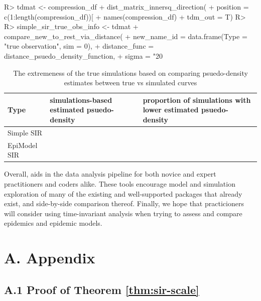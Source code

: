 \documentclass[
  shortnames]{jss}
\begin{document}
\begin{CodeChunk}
\begin{CodeInput}
R> tdmat <- compression_df %
+   dist_matrix_innersq_direction(
+     position = c(1:length(compression_df))[
+       names(compression_df) %
+     tdm_out = T)
R> 
R> simple_sir_true_obs_info <- tdmat %
+   compare_new_to_rest_via_distance(
+     new_name_id = data.frame(Type = "true observation", sim = 0),
+     distance_func = distance_psuedo_density_function, 
+     sigma = "20%
\end{CodeInput}
\end{CodeChunk}

\begin{CodeChunk}
\begin{table}[!h]

\caption{\label{tab:hags-extreme}The extremeness of the true simulations based on comparing psuedo-density estimates between true vs simulated curves}
\centering
\begin{tabular}[t]{l>{\raggedleft\arraybackslash}p{6cm}>{\raggedleft\arraybackslash}p{6cm}}
\toprule
Type & simulations-based estimated psuedo-density & proportion of simulations with lower estimated psuedo-density\\
\midrule
Simple SIR & 0.0036733 & 0.00\\
EpiModel SIR & 0.0149686 & 0.02\\
\bottomrule
\end{tabular}
\end{table}

\end{CodeChunk}

Overall,  aids in the data analysis pipeline for both
novice and expert practitioners and coders alike. These tools encourage
model and simulation exploration of many of the existing and
well-supported packages that already exist, and side-by-side comparison
thereof. Finally, we hope that practicioners will consider using
time-invariant analysis when trying to assess and compare epidemics and
epidemic models.

\hypertarget{a.-appendix}{%
\section*{A. Appendix}\label{a.-appendix}}

\hypertarget{a.1-proof-of-theorem}{%
\subsection*{\texorpdfstring{A.1 Proof of Theorem
\ref{thm:sir-scale}}{A.1 Proof of Theorem }}\label{a.1-proof-of-theorem}}
\end{document}
